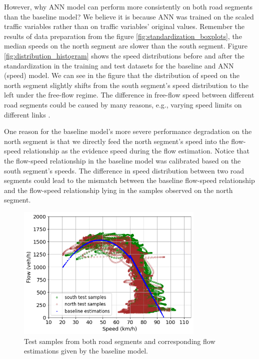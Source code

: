 \documentclass[english]{kththesis}
\begin{document}
However, why ANN model can perform more consistently on both road segments than the baseline model? We believe it is because ANN was trained on the scaled traffic variables rather than on traffic variables' original values. Remember the results of data preparation from the figure \ref{fig:standardization_boxplots}, the median speeds on the north segment are slower than the south segment. Figure \ref{fig:distribution_histogram} shows the speed distributions before and after the standardization in the training and test datasets for the baseline and ANN (speed) model. We can see in the figure that the distribution of speed on the north segment slightly shifts from the south segment's speed distribution to the left under the free-flow regime. The difference in free-flow speed between different road segments could be caused by many reasons, e.g., varying speed limits on different links \cite{neumann_bayesian}.


One reason for the baseline model's more severe performance degradation on the north segment is that we directly feed the north segment's speed into the flow-speed relationship as the evidence speed during the flow estimation. Notice that the flow-speed relationship in the baseline model was calibrated based on the south segment's speeds. The difference in speed distribution between two road segments could lead to the mismatch between the baseline flow-speed relationship and the flow-speed relationship lying in the samples observed on the north segment.

\begin{figure}[!ht]
    \centering
    \includegraphics[width=0.8\textwidth]{relation_shift_baseline.png}
    \caption{Test samples from both road segments and corresponding flow estimations given by the baseline model.}
    \label{fig:relation_shift_baseline}
\end{figure}
\end{document}
